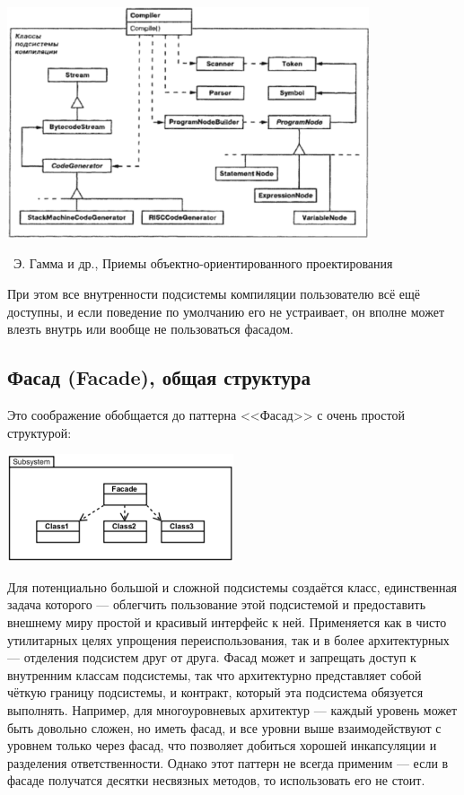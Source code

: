 \documentclass[a5paper]{article}
\newcommand{\attribution}[1] {
    \vspace{-5mm}\begin{flushright}\begin{scriptsize}%
    {\textcopyright\, #1}\end{scriptsize}\end{flushright}
}
\begin{document}
\begin{center}
    \includegraphics[width=0.8\textwidth]{facadeMotivation.png}
    \attribution{Э. Гамма и др., Приемы объектно-ориентированного проектирования}
\end{center}

При этом все внутренности подсистемы компиляции пользователю всё ещё доступны, и если поведение по умолчанию его не устраивает, он вполне может влезть внутрь или вообще не пользоваться фасадом.

\subsection{Фасад (Facade), общая структура}

Это соображение обобщается до паттерна <<Фасад>> с очень простой структурой:

\begin{center}
    \includegraphics[width=0.5\textwidth]{facade.png}
\end{center}

Для потенциально большой и сложной подсистемы создаётся класс, единственная задача которого --- облегчить пользование этой подсистемой и предоставить внешнему миру простой и красивый интерфейс к ней. Применяется как в чисто утилитарных целях упрощения переиспользования, так и в более архитектурных --- отделения подсистем друг от друга. Фасад может и запрещать доступ к внутренним классам подсистемы, так что архитектурно представляет собой чёткую границу подсистемы, и контракт, который эта подсистема обязуется выполнять. Например, для многоуровневых архитектур --- каждый уровень может быть довольно сложен, но иметь фасад, и все уровни выше взаимодействуют с уровнем только через фасад, что позволяет добиться хорошей инкапсуляции и разделения ответственности. Однако этот паттерн не всегда применим --- если в фасаде получатся десятки несвязных методов, то использовать его не стоит.
\end{document}
